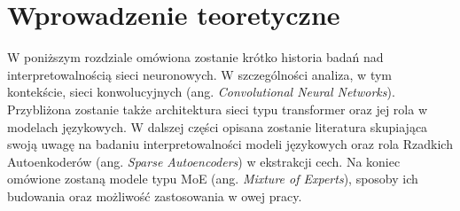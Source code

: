 \chapter{Wprowadzenie teoretyczne}
W poniższym rozdziale omówiona zostanie krótko historia badań nad interpretowalnością sieci neuronowych. W szczególności analiza, w tym kontekście, sieci konwolucyjnych (ang. \textit{Convolutional Neural Networks}). Przybliżona zostanie także architektura sieci typu transformer oraz jej rola w modelach językowych. W dalszej części opisana zostanie literatura skupiająca swoją uwagę na badaniu interpretowalności modeli językowych oraz rola Rzadkich Autoenkoderów (ang. \textit{Sparse Autoencoders}) w ekstrakcji cech. Na koniec omówione zostaną modele typu MoE (ang. \textit{Mixture of Experts}), sposoby ich budowania oraz możliwość zastosowania w owej pracy.

